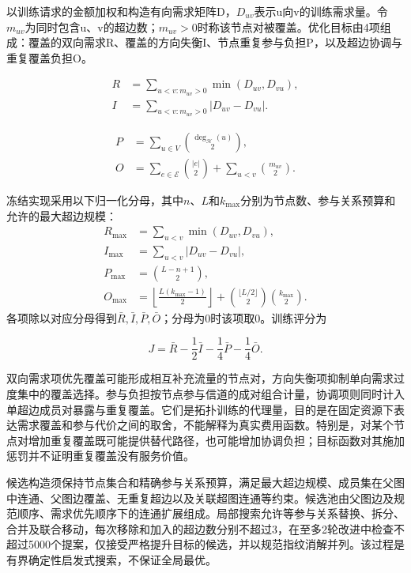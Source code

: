 \documentclass[UTF8,a4paper,twocolumn,fontset=none,zihao=5]{ctexart}
\begin{document}
以训练请求的金额加权和构造有向需求矩阵D，$D_{uv}$表示u向v的训练需求量。令$m_{uv}$为同时包含u、v的超边数；$m_{uv}>0$时称该节点对被覆盖。优化目标由4项组成：覆盖的双向需求R、覆盖的方向失衡I、节点重复参与负担P，以及超边协调与重复覆盖负担O。



\begin{equation}
\begin{aligned}R&=\sum_{u<v:m_{uv}>0}\min(D_{uv},D_{vu}),\\I&=\sum_{u<v:m_{uv}>0}|D_{uv}-D_{vu}|.\end{aligned}
\label{eq:9}\end{equation}



\begin{equation}
\begin{aligned}P&=\sum_{u\in V}\binom{\deg_{\mathcal H}(u)}{2},\\O&=\sum_{e\in\mathcal E}\binom{|e|}{2}+\sum_{u<v}\binom{m_{uv}}{2}.\end{aligned}
\label{eq:10}\end{equation}


冻结实现采用以下归一化分母，其中$n$、$L$和$k_{\max}$分别为节点数、参与关系预算和允许的最大超边规模：
\[
\begin{aligned}
R_{\max}&=\sum_{u<v}\min(D_{uv},D_{vu}),\\
I_{\max}&=\sum_{u<v}|D_{uv}-D_{vu}|,\\
P_{\max}&=\binom{L-n+1}{2},\\
O_{\max}&=\left\lfloor\frac{L(k_{\max}-1)}{2}\right\rfloor
+\binom{\lfloor L/2\rfloor}{2}\binom{k_{\max}}{2}.
\end{aligned}
\]
各项除以对应分母得到$\bar R,\bar I,\bar P,\bar O$；分母为0时该项取0。训练评分为



\begin{equation}
J=\bar R-\frac{1}{2}\bar I-\frac{1}{4}\bar P-\frac{1}{4}\bar O.
\label{eq:11}\end{equation}


双向需求项优先覆盖可能形成相互补充流量的节点对，方向失衡项抑制单向需求过度集中的覆盖选择。参与负担按节点参与信道的成对组合计量，协调项则同时计入单超边成员对暴露与重复覆盖。它们是拓扑训练的代理量，目的是在固定资源下表达需求覆盖和参与代价之间的取舍，不能解释为真实费用函数。特别是，对某个节点对增加重复覆盖既可能提供替代路径，也可能增加协调负担；目标函数对其施加惩罚并不证明重复覆盖没有服务价值。


候选构造须保持节点集合和精确参与关系预算，满足最大超边规模、成员集在父图中连通、父图边覆盖、无重复超边以及关联超图连通等约束。候选池由父图边及规范顺序、需求优先顺序下的连通扩展组成。局部搜索允许等参与关系替换、拆分、合并及联合移动，每次移除和加入的超边数分别不超过3，在至多2轮改进中检查不超过5000个提案，仅接受严格提升目标的候选，并以规范指纹消解并列。该过程是有界确定性启发式搜索，不保证全局最优。
\end{document}
